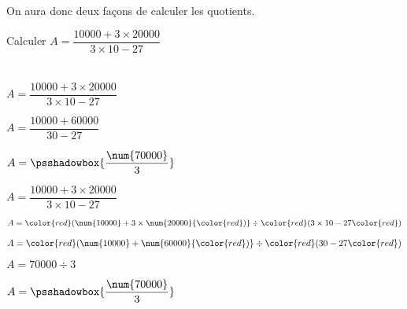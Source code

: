 \begin{exemple*1}
    On aura donc deux façons de calculer les quotients.

    \medskip
    Calculer $A=\dfrac{\num{10000}+ 3\times \num{20000}}{3\times 10 - 27}$

    \medskip
    \correction    
    \begin{minipage}{0.45\linewidth}
        \begin{spacing}{1.5}
            \begin{list}{}{}
                \item $\phantom{A}$
                \item $A=\dfrac{\num{10000}+ 3\times \num{20000}}{3\times 10 - 27}$
                \item $A=\dfrac{\num{10000}+ \num{60000}}{30 - 27}$            
                \item $A=\psshadowbox{\dfrac{\num{70000}}{3}}$
            \end{list}
        \end{spacing}
    \end{minipage}      
    \begin{minipage}{0.5\linewidth}        
        \begin{list}{}{}
            \item $A=\dfrac{\num{10000}+ 3\times \num{20000}}{3\times 10 - 27}$
            
            \smallskip
            \item $A={\color{red}(}\num{10000}+ 3\times \num{20000}{\color{red})}\div{\color{red}(}3\times 10 - 27{\color{red})}$
            \item $A={\color{red}(}\num{10000}+ \num{60000}{\color{red})}\div{\color{red}(}30 - 27{\color{red})}$
            \item $A=\num{70000}\div 3$
            \item $A=\psshadowbox{\dfrac{\num{70000}}{3}}$
        \end{list}
    \end{minipage}   
\end{exemple*1}

